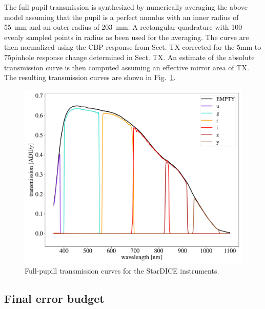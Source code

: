The full pupil transmission is synthesized by numerically averaging
the above model assuming that the pupil is a perfect annulus with an
inner radius of \SI{55}{mm} and an outer radius of \SI{203}{mm}. A
rectangular quadrature with 100 evenly sampled points in radius as
been used for the averaging. The curve are then normalized using the
CBP response from Sect. TX corrected for the 5mm to 75\micron pinhole
response change determined in Sect. TX. An estimate of the absolute
transmission curve is then computed assuming an effective mirror area
of TX. The resulting transmission curves are shown in
Fig.~\ref{fig:fullpupiltrans}.
\begin{figure}
  \centering
  \includegraphics[width=1\linewidth]{fig/fullpupill.pdf}
  \caption{Full-pupill transmission curves for the StarDICE instruments.}
  \label{fig:fullpupiltrans}
\end{figure}


\subsection{Final error budget}
